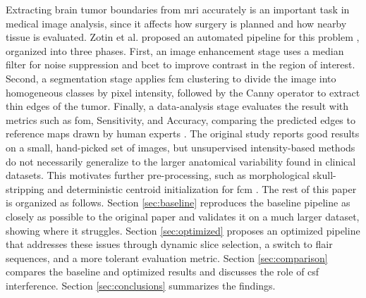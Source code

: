 Extracting brain tumor boundaries from \gls{mri} accurately is an important task in medical image analysis, since it affects how surgery is planned and how nearby tissue is evaluated. Zotin et al. proposed an automated pipeline for this problem \cite{zotin2018edge}, organized into three phases. First, an image enhancement stage uses a median filter for noise suppression and \gls{bcet} to improve contrast in the region of interest. Second, a segmentation stage applies \gls{fcm} clustering to divide the image into homogeneous classes by pixel intensity, followed by the Canny operator to extract thin edges of the tumor. Finally, a data-analysis stage evaluates the result with metrics such as \gls{fom}, Sensitivity, and Accuracy, comparing the predicted edges to reference maps drawn by human experts \cite{pratt1979quantitative}. The original study reports good results on a small, hand-picked set of images, but unsupervised intensity-based methods do not necessarily generalize to the larger anatomical variability found in clinical datasets. This motivates further pre-processing, such as morphological skull-stripping \cite{hooda2014brain} and deterministic centroid initialization for \gls{fcm} \cite{benson2016brain, szilagyi2003mri}. The rest of this paper is organized as follows. Section \ref{sec:baseline} reproduces the baseline pipeline as closely as possible to the original paper and validates it on a much larger dataset, showing where it struggles. Section \ref{sec:optimized} proposes an optimized pipeline that addresses these issues through dynamic slice selection, a switch to \gls{flair} sequences, and a more tolerant evaluation metric. Section \ref{sec:comparison} compares the baseline and optimized results and discusses the role of \gls{csf} interference. Section \ref{sec:conclusions} summarizes the findings.